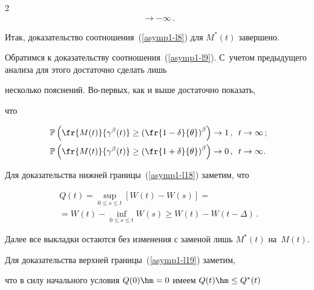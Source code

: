 \begin{multicols}{2}
\begin{multline*}
{}\to -\infty \,.


\end{multline*}





Итак, доказательство соотношения~(\ref{asymp1-l8}) для $M^*(t)$ завершено.





\smallskip





Обратимся к   доказательству соотношения~(\ref{asymp1-l9}). С~учетом предыдущего анализа для этого достаточно сделать лишь


несколько пояснений. Во-пер\-вых, как и выше достаточно показать,


что


\begin{align}


\mathbb{P} \left( \fr{M(t)}{\gamma^\beta(t)} \geq \left(


\fr{1-\delta}{\theta} \right)^\beta \right ) &\to 1\,,\enskip t \to \infty \,; \label{asymp1-l18}


\\


\mathbb{P} \left( \fr{M(t)}{\gamma^\beta(t)} \geq \left(


\fr{1+\delta}{\theta} \right)^\beta \right) &\to 0\,,\enskip t \to \infty. \label{asymp1-l19}


\end{align}


 Для доказательства нижней границы~(\ref{asymp1-l18}) заметим, что


\begin{multline*}


Q(t)=\sup\limits_{0\leq s \leq t}[W(t)-W(s)]={}\\


{}=W(t)-\inf\limits_{0\leq s \leq t} W(s)\geq


 W(t)-W(t-\Delta)\,.


\end{multline*}


Далее все выкладки остаются без изменения с заменой лишь $M^*(t)$ на~$M(t)$.





Для доказательства верхней границы~(\ref{asymp1-l19}) заметим,


что в силу начального условия $Q(0)\hm=0$ имеем $Q(t)\hm \leq Q^*(t)$



\end{multicols}
